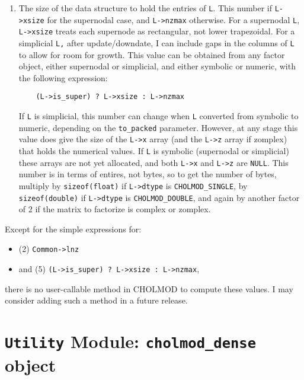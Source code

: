 \documentclass[11pt]{article}
\begin{document}
\begin{enumerate}
\item
The size of the data structure to hold the entries of \verb'L'.  This
number if \verb'L->xsize' for the supernodal case, and \verb'L->nzmax'
otherwise. For a supernodal \verb'L', \verb'L->xsize' treats each supernode as
rectangular, not lower trapezoidal. For a simplicial \verb'L,' after
update/downdate, I can include gaps in the columns of \verb'L' to allow for
room for growth.  This value can be obtained from any factor object,
either supernodal or simplicial,  and either symbolic or numeric, with the
following expression:

\begin{verbatim}
    (L->is_super) ? L->xsize : L->nzmax
\end{verbatim}

If \verb'L' is simplicial, this number can change when \verb'L' converted from
symbolic to numeric, depending on the \verb'to_packed' parameter.  However, at
any stage this value does give the size of the \verb'L->x' array (and the
\verb'L->z' array if zomplex) that holds the numerical values.  If \verb'L' is
symbolic (supernodal or simplicial) these arrays are not yet allocated, and
both \verb'L->x' and \verb'L->z' are \verb'NULL'.  This number is in terms of
entires, not bytes, so to get the number of bytes, multiply by
\verb'sizeof(float)' if \verb'L->dtype' is \verb'CHOLMOD_SINGLE', by
\verb'sizeof(double)' if \verb'L->dtype' is \verb'CHOLMOD_DOUBLE', and again by
another factor of 2 if the matrix to factorize is complex or zomplex.

\end{enumerate}

Except for the simple expressions for:
\begin{itemize}
\item
(2) \verb'Common->lnz'
\item
and (5) \verb'(L->is_super) ? L->xsize : L->nzmax',
\end{itemize}
there is no user-callable method in CHOLMOD to compute these values.
I may consider adding such a method in a future release.

\newpage \section{{\tt Utility} Module: {\tt cholmod\_dense} object}
\label{cholmod_dense}
\end{document}
